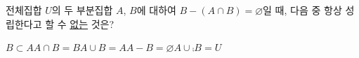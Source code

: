 전체집합 $U$의 두 부분집합 $A$, $B$에 대하여 $B-(A\cap B)=\varnothing$일 때, 다음 중 항상 성립한다고 할 수 \underline{없는} 것은?
\begin{choices32}{$B\subset A$}{$A\cap B=B$}{$A\cup B=A$}{$A-B=\varnothing$}{$A\cup\comp{B}=U$}\end{choices32}

